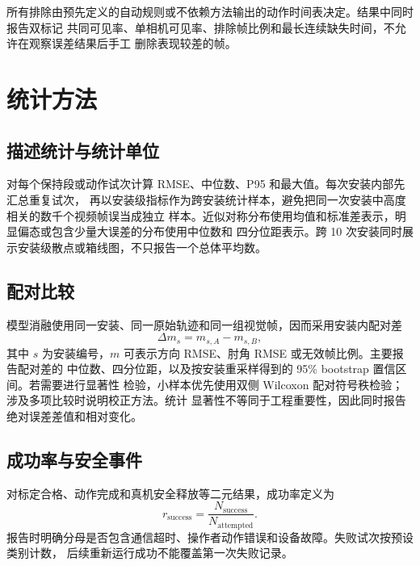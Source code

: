 所有排除由预先定义的自动规则或不依赖方法输出的动作时间表决定。结果中同时报告双标记
共同可见率、单相机可见率、排除帧比例和最长连续缺失时间，不允许在观察误差结果后手工
删除表现较差的帧。

\section{统计方法}
\label{sec:ch6_statistical_methods}

\subsection{描述统计与统计单位}
\label{subsec:ch6_descriptive_statistics}

对每个保持段或动作试次计算 RMSE、中位数、P95 和最大值。每次安装内部先汇总重复试次，
再以安装级指标作为跨安装统计样本，避免把同一次安装中高度相关的数千个视频帧误当成独立
样本。近似对称分布使用均值和标准差表示，明显偏态或包含少量大误差的分布使用中位数和
四分位距表示。跨 10 次安装同时展示安装级散点或箱线图，不只报告一个总体平均数。

\subsection{配对比较}
\label{subsec:ch6_paired_comparison}

模型消融使用同一安装、同一原始轨迹和同一组视觉帧，因而采用安装内配对差
\begin{equation}
  \Delta m_s=m_{s,A}-m_{s,B},
  \label{eq:ch6_paired_metric_difference}
\end{equation}
其中 $s$ 为安装编号，$m$ 可表示方向 RMSE、肘角 RMSE 或无效帧比例。主要报告配对差的
中位数、四分位距，以及按安装重采样得到的 95\% bootstrap 置信区间。若需要进行显著性
检验，小样本优先使用双侧 Wilcoxon 配对符号秩检验；涉及多项比较时说明校正方法。统计
显著性不等同于工程重要性，因此同时报告绝对误差差值和相对变化。

\subsection{成功率与安全事件}
\label{subsec:ch6_success_safety_events}

对标定合格、动作完成和真机安全释放等二元结果，成功率定义为
\begin{equation}
  r_{\mathrm{success}}=
  \frac{N_{\mathrm{success}}}{N_{\mathrm{attempted}}}.
  \label{eq:ch6_success_rate}
\end{equation}
报告时明确分母是否包含通信超时、操作者动作错误和设备故障。失败试次按预设类别计数，
后续重新运行成功不能覆盖第一次失败记录。

